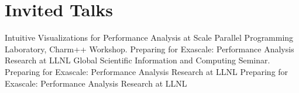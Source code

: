 \section{Invited Talks}
		{Intuitive Visualizations for Performance Analysis at Scale}
		{}{}{Parallel Programming Laboratory, Charm++ Workshop.}
		{Preparing for Exascale: Performance Analysis Research at LLNL}
		{}{}
		{Global Scientific Information and Computing Seminar.}
		{Preparing for Exascale: Performance Analysis Research at LLNL}
		{}{}{}
		{Preparing for Exascale: Performance Analysis Research at LLNL}
		{}{}{}
